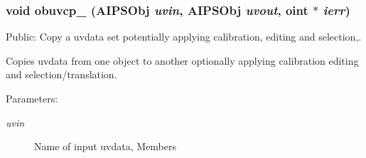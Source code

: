\subsubsection{\setlength{\rightskip}{0pt plus 5cm}void obuvcp\_\- ({\bf AIPSObj} {\em uvin}, {\bf AIPSObj} {\em uvout}, {\bf oint} $\ast$ {\em ierr})}\label{ObitAIPSFortran_8c_a6}


Public: Copy a uvdata set potentially applying calibration, editing and selection,. 

Copies uvdata from one object to another optionally applying calibration editing and selection/translation. \begin{Desc}
\item[Parameters:]
\begin{description}
\item[{\em uvin}]Name of input uvdata, Members \begin{itemize}

\end{itemize}
\end{description}
\end{Desc}
